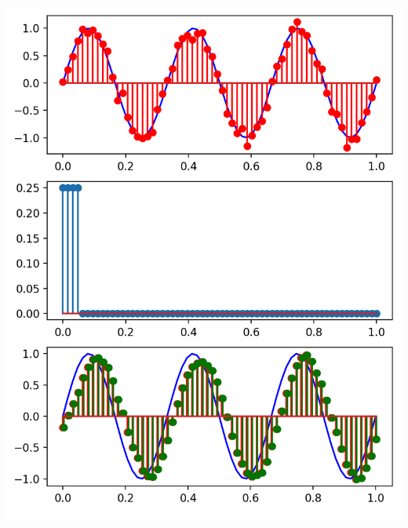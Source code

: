 \begin{listing}[ht]
    \noindent
    \begin{minipage}{0.51\textwidth}
        \strut\vspace*{-\baselineskip}\newline
        \inputminted[firstline=4, lastline=18]{python3}{code/dft_conv.py}
    \end{minipage}%
    \begin{minipage}{0.48\textwidth}
        \strut\vspace*{-\baselineskip}\newline
        \includegraphics[width=\textwidth]{code/dft_conv.png}
    \end{minipage}
    \label{py:dft_conv}
\end{listing}
%
